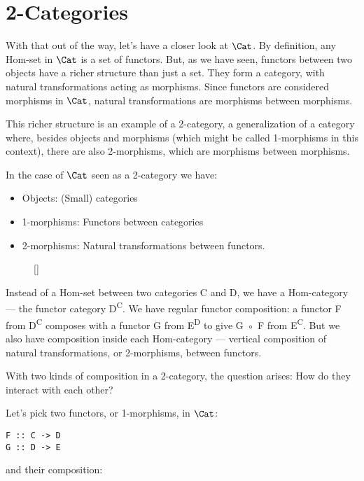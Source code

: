 \section{2-Categories}\label{categories}

With that out of the way, let's have a closer look at $\Cat$. By
definition, any Hom-set in $\Cat$ is a set of functors. But, as we
have seen, functors between two objects have a richer structure than
just a set. They form a category, with natural transformations acting as
morphisms. Since functors are considered morphisms in $\Cat$,
natural transformations are morphisms between morphisms.

This richer structure is an example of a 2-category, a generalization of
a category where, besides objects and morphisms (which might be called
1-morphisms in this context), there are also 2-morphisms, which are
morphisms between morphisms.

In the case of $\Cat$ seen as a 2-category we have:

\begin{itemize}
\tightlist
\item
  Objects: (Small) categories
\item
  1-morphisms: Functors between categories
\item
  2-morphisms: Natural transformations between functors.
\end{itemize}

\begin{wrapfigure}[11]{R}{0pt}
\raisebox{0pt}[\dimexpr{}\baselineskip\relax]{
}%
\end{wrapfigure}

\noindent
Instead of a Hom-set between two categories C and D, we have a
Hom-category --- the functor category D\textsuperscript{C}. We have
regular functor composition: a functor F from D\textsuperscript{C}
composes with a functor G from E\textsuperscript{D} to give G ◦ F from
E\textsuperscript{C}. But we also have composition inside each
Hom-category --- vertical composition of natural transformations, or
2-morphisms, between functors.

\noindent
With two kinds of composition in a 2-category, the question arises: How
do they interact with each other?

Let's pick two functors, or 1-morphisms, in $\Cat$:

\begin{Verbatim}[commandchars=\\\{\}]
F :: C -> D
G :: D -> E
\end{Verbatim}
and their composition:

